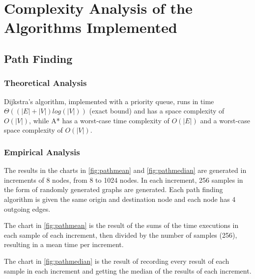 \documentclass[a4paper, 12pt]{report}
\begin{document}
    \chapter{Complexity Analysis of the Algorithms Implemented} %
     
    \section{Path Finding} 
    \subsection{Theoretical Analysis}
    
    Dijkstra's algorithm, implemented with a priority queue, runs in time $\displaystyle \Theta((|E|+|V|)log(|V|))$ (exact bound) and has a space complexity of $\displaystyle O(|V|)$, while A* has a worst-case time complexity of $\displaystyle O(|E|)$ and a worst-case space complexity of $\displaystyle O(|V|)$.
    
    \subsection{Empirical Analysis}
    
    The results in the charts in \ref{fig:pathmean} and \ref{fig:pathmedian} are generated in increments of 8 nodes, from 8 to 1024 nodes. In each increment, 256 samples in the form of randomly generated graphs are generated. Each path finding algorithm is given the same origin and destination node and each node has 4 outgoing edges.
    
    The chart in \ref{fig:pathmean} is the result of the sums of the time executions in each sample of each increment, then divided by the number of samples (256), resulting in a mean time per increment.
    
    The chart in \ref{fig:pathmedian} is the result of recording every result of each sample in each increment and getting the median of the results of each increment.
    
\end{document}
